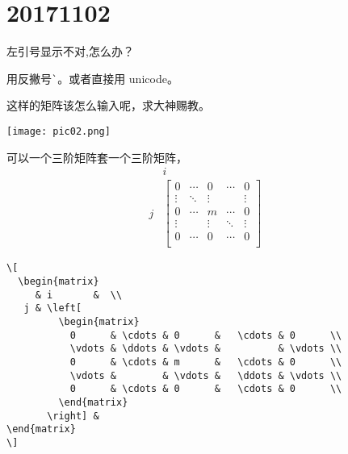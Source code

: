 \documentclass[QAofGroup.tex]{subfiles}
\begin{document}
%
%

\chapter{20171102}\label{ch1102}

\begin{qst}\label{Q2017110201}
左引号显示不对,怎么办？
\end{qst}
\ans 用反撇号\verb|`|。或者直接用 unicode。

\begin{qst}\label{Q2017110202}
这样的矩阵该怎么输入呢，求大神赐教。

\texttt{[image: pic02.png]}
\end{qst}
\ans 可以一个三阶矩阵套一个三阶矩阵，
\[
\begin{matrix}
&	i&	\\
j&	\left[ \begin{matrix}
0&	\cdots&	0&	\cdots&	0\\
\vdots&	\ddots&	\vdots&	&	\vdots\\
0&	\cdots&	m&	\cdots&	0\\
\vdots&	&	\vdots&	\ddots&	\vdots\\
0&	\cdots&	0&	\cdots&	0\\
\end{matrix} \right]&
\end{matrix}
\]
\begin{verbatim}
\[
  \begin{matrix}
     & i       &  \\
   j & \left[
         \begin{matrix}
           0      & \cdots & 0      &	\cdots & 0      \\
           \vdots & \ddots & \vdots &	       & \vdots \\
           0      & \cdots & m      &	\cdots & 0      \\
           \vdots &        & \vdots &	\ddots & \vdots \\
           0      & \cdots & 0      &	\cdots & 0      \\
         \end{matrix}
       \right] &
\end{matrix}
\]
\end{verbatim}
\end{document}
